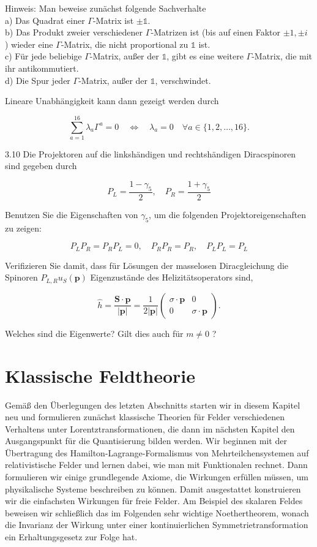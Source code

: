 \documentclass[10pt, letterpaper]{article}
\begin{document}
Hinweis: Man beweise zunächst folgende Sachverhalte\\
a) Das Quadrat einer $\Gamma$-Matrix ist $\pm \mathbb{1}$.\\
b) Das Produkt zweier verschiedener $\Gamma$-Matrizen ist (bis auf einen Faktor $\pm 1, \pm i$ ) wieder eine $\Gamma$-Matrix, die nicht proportional zu $\mathbb{1}$ ist.\\
c) Für jede beliebige $\Gamma$-Matrix, außer der $\mathbb{1}$, gibt es eine weitere $\Gamma$-Matrix, die mit ihr antikommutiert.\\
d) Die Spur jeder $\Gamma$-Matrix, außer der $\mathbb{1}$, verschwindet.

Lineare Unabhängigkeit kann dann gezeigt werden durch

$$
\sum_{a=1}^{16} \lambda_{a} \Gamma^{a}=0 \quad \Leftrightarrow \quad \lambda_{a}=0 \quad \forall a \in\{1,2, \ldots, 16\} .
$$

3.10 Die Projektoren auf die linkshändigen und rechtshändigen Diracspinoren sind gegeben durch

$$
P_{L}=\frac{1-\gamma_{5}}{2}, \quad P_{R}=\frac{1+\gamma_{5}}{2}
$$

Benutzen Sie die Eigenschaften von $\gamma_{5}$, um die folgenden Projektoreigenschaften zu zeigen:

$$
P_{L} P_{R}=P_{R} P_{L}=0, \quad P_{R} P_{R}=P_{R}, \quad P_{L} P_{L}=P_{L}
$$

Verifizieren Sie damit, dass für Lösungen der masselosen Diracgleichung die Spinoren $P_{L, R} u_{S}(\mathbf{p})$ Eigenzustände des Helizitätsoperators sind,

$$
\hat{h}=\frac{\mathbf{S} \cdot \mathbf{p}}{|\mathbf{p}|}=\frac{1}{2|\mathbf{p}|}\left(\begin{array}{cc}
\sigma \cdot \mathbf{p} & 0 \\
0 & \sigma \cdot \mathbf{p}
\end{array}\right) .
$$

Welches sind die Eigenwerte? Gilt dies auch für $m \neq 0$ ?


\pagebreak

\section{Klassische Feldtheorie}



Gemäß den Überlegungen des letzten Abschnitts starten wir in diesem Kapitel neu und formulieren zunächst klassische Theorien für Felder verschiedenen Verhaltens unter Lorentztransformationen, die dann im nächsten Kapitel den Ausgangspunkt für die Quantisierung bilden werden. Wir beginnen mit der Übertragung des Hamilton-Lagrange-Formalismus von Mehrteilchensystemen auf relativistische Felder und lernen dabei, wie man mit Funktionalen rechnet. Dann formulieren wir einige grundlegende Axiome, die Wirkungen erfüllen müssen, um physikalische Systeme beschreiben zu können. Damit ausgestattet konstruieren wir die einfachsten Wirkungen für freie Felder. Am Beispiel des skalaren Feldes beweisen wir schließlich das im Folgenden sehr wichtige Noethertheorem, wonach die Invarianz der Wirkung unter einer kontinuierlichen Symmetrietransformation ein Erhaltungsgesetz zur Folge hat.
\end{document}

